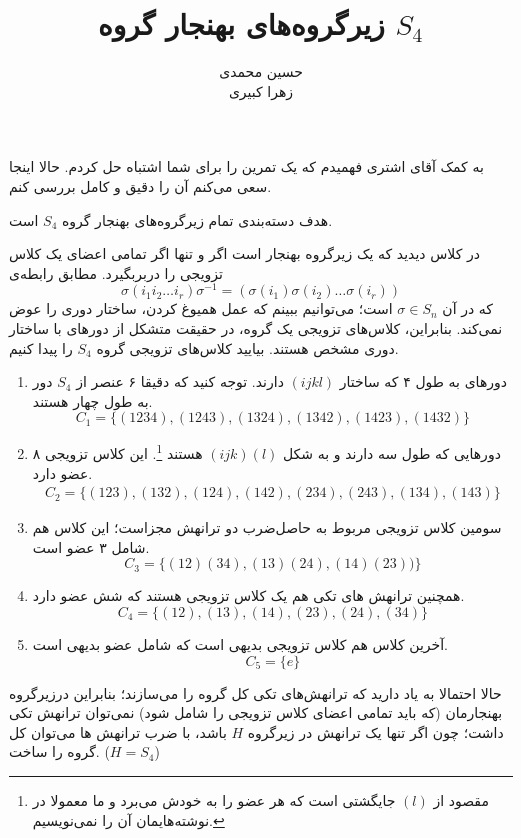 \documentclass[a4paper, 12pt]{article}
\title{\textbf{
  زیرگروه‌های بهنجار گروه 
  $S_4$
}}
\author{حسین محمدی
\\
زهرا کبیری}
\date{}
\begin{document}
\maketitle

\begin{mdframed}
	به کمک آقای اشتری فهمیدم که یک تمرین‌ را برای شما اشتباه حل کردم. حالا اینجا سعی می‌کنم آن را دقیق و کامل بررسی کنم.
\end{mdframed}

هدف دسته‌بندی تمام زیرگروه‌های بهنجار گروه $S_4$ است.

در کلاس دیدید که یک زیرگروه بهنجار است اگر و تنها اگر تمامی اعضای یک کلاس‌ تزویجی را دربربگیرد. مطابق رابطه‌ی 
\[
\sigma (i_1 i_2 \dots i_r)\sigma^{-1} = (\sigma(i_1) \sigma(i_2) \dots \sigma(i_r))
\]
که در آن 
$\sigma \in S_n$
 است؛ می‌توانیم ببینم که عمل همیوغ کردن، ساختار دوری را عوض نمی‌کند. بنابراین، کلاس‌های تزویجی یک گروه، در حقیقت متشکل از دورهای با ساختار دوری مشخص هستند. بیایید کلاس‌های تزویجی گروه $S_4$ را پیدا کنیم.
\begin{enumerate}
	\item 
	دورهای به طول ۴ که ساختار 
	$(ijkl)$ دارند. توجه کنید که دقیقا ۶ عنصر از 
	$S_4$
	دور به طول چهار هستند.
	\[
	C_1=\{(1234),(1243),(1324),(1342),(1423),(1432)\}
	\]
	\item دورهایی که طول سه دارند و به شکل 
	$(ijk)(l)$
	هستند
	\footnote{مقصود از $(l)$ جایگشتی است که هر عضو را به خودش می‌برد و ما معمولا در نوشته‌هایمان آن را نمی‌نویسیم.}.
	این کلاس تزویجی ۸ عضو دارد.
	\begin{equation*}
		\begin{aligned}
			C_2 = \{
			(123),(132),(124),(142),(234),(243),(134),(143)
			\}
		\end{aligned}
	\end{equation*}
	\item سومین کلاس تزویجی مربوط به حاصل‌ضرب دو ترانهش مجزاست؛ این کلاس هم شامل ۳ عضو است.
	\[
	C_3= \{(12)(34),(13)(24),(14)(23))\}
	\]
	\item همچنین ترانهش های تکی هم یک کلاس تزویجی هستند که شش عضو دارد.
	\[
	C_4 =\{(12),(13),(14),(23),(24),(34)\}
	\]
	\item آخرین کلاس هم کلاس تزویجی بدیهی است که شامل عضو بدیهی است.
	\[
	C_5 = \{e\}
	\]
\end{enumerate}

حالا احتمالا به یاد دارید که ترانهش‌های تکی کل گروه را می‌سازند؛ بنابراین درزیرگروه بهنجارمان (که باید تمامی اعضای کلاس تزویجی را شامل شود) نمی‌توان ترانهش تکی داشت؛ چون اگر تنها یک ترانهش در زیرگروه $H$ باشد، با ضرب ترانهش ها می‌توان کل گروه را ساخت.
($H=S_4$)
\end{document}

